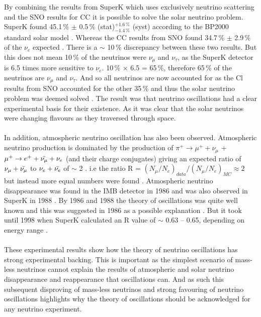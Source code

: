 \\\\By combining the results from SuperK which uses exclusively neutrino scattering and the SNO results for CC it is possible to solve the solar neutrino problem. SuperK found 45.1\,\% $\pm$ 0.5\,\% (stat)$^{+1.6\,\%}_{-1.4\,\%}$ (syst) according to the BP2000 standard solar model \cite{superK2001}. Whereas the CC results from SNO found 34.7\,\% $\pm$ 2.9\,\% of the $\nu_e$ expected \cite{sno2001}. There is a $\sim$ 10\,\% discrepancy between these two results. But this does not mean 10\,\% of the neutrinos were $\nu_\mu$ and $\nu_\tau$, as the SuperK detector is 6.5 times more sensitive to $\nu_e$. 10\,\% $\times$ 6.5 = 65\,\%, therefore 65\,\% of the neutrinos are $\nu_\mu$ and $\nu_\tau$. And so all neutrinos are now accounted for as the Cl results from SNO accounted for the other 35\,\% and thus the solar neutrino problem was deemed solved \cite{griffiths2008book} \cite{griffiths2008neutrinoOscillations}. The result was that neutrino oscillations had a clear experimental basis for their existence. As it was clear that the solar neutrinos were changing flavours as they traversed through space. 
\\\\In addition, atmospheric neutrino oscillation has also been observed. Atmospheric neutrino production is dominated by the production of $\pi^+ \rightarrow \mu^+ + \nu_\mu$ + $\mu^+ \rightarrow e^+ + \Bar{\nu_\mu} + \nu_e$ (and their charge conjugates) giving an expected ratio of $\nu_\mu + \Bar{\nu_\mu}$ to $\nu_e + \Bar{\nu_e}$ of $\sim$ 2 \cite{fukuda_skAtmosAnnounce_1998}. i.e the ratio R = $(N_\mu/N_e)_{data}/(N_\mu/N_e)_{MC} \approx 2$ but instead more equal numbers were found \cite{fukuda_skAtmosAnnounce_1998} \cite{KAJITA_sk_atmospheric_2016}. Atmospheric neutrino disappearance was found in the IMB detector in 1986 \cite{tjHaines_AtmosModel_1986} and was also observed in SuperK in 1988 \cite{Hirata_sk_atmosStudy_1988} \cite{KAJITA_sk_atmospheric_2016}. By 1986 and 1988 the theory of oscillations was quite well known and this was suggested in 1986 as a possible explanation \cite{tjHaines_AtmosModel_1986}. But it took until 1998 when SuperK calculated an R value of $\sim$ 0.63 -- 0.65, depending on energy range \cite{fukuda_skAtmosAnnounce_1998}. 
\\\\These experimental results show how the theory of neutrino oscillations has strong experimental backing. This is important as the simplest scenario of mass-less neutrinos cannot explain the results of atmospheric and solar neutrino disappearance and reappearance that oscillations can. And as such this subsequent disproving of mass-less neutrinos and strong favouring of neutrino oscillations highlights why the theory of oscillations should be acknowledged for any neutrino experiment. 

